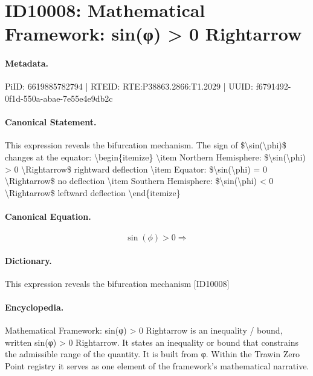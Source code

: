 \section*{ID10008: Mathematical Framework: sin(φ) > 0 Rightarrow}
\paragraph{Metadata.}
PiID: 6619885782794 | RTEID: RTE:P38863.2866:T1.2029 | UUID: f6791492-0f1d-550a-abae-7e55e4e9db2c

\paragraph{Canonical Statement.}
This expression reveals the bifurcation mechanism. The sign of \$\textbackslash{}sin(\textbackslash{}phi)\$ changes at the equator: \textbackslash{}begin\{itemize\} \textbackslash{}item Northern Hemisphere: \$\textbackslash{}sin(\textbackslash{}phi) > 0 \textbackslash{}Rightarrow\$ rightward deflection \textbackslash{}item Equator: \$\textbackslash{}sin(\textbackslash{}phi) = 0 \textbackslash{}Rightarrow\$ no deflection \textbackslash{}item Southern Hemisphere: \$\textbackslash{}sin(\textbackslash{}phi) < 0 \textbackslash{}Rightarrow\$ leftward deflection \textbackslash{}end\{itemize\}

\paragraph{Canonical Equation.}
\[
\sin(\phi) > 0 \Rightarrow
\]

\paragraph{Dictionary.}
This expression reveals the bifurcation mechanism [ID10008]

\paragraph{Encyclopedia.}
Mathematical Framework: sin(φ) > 0 Rightarrow is an inequality / bound, written sin(φ) > 0 Rightarrow. It states an inequality or bound that constrains the admissible range of the quantity. It is built from φ. Within the Trawin Zero Point registry it serves as one element of the framework's mathematical narrative.
